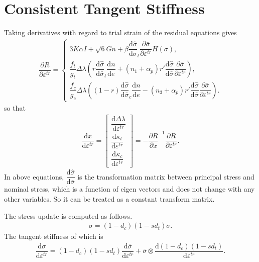 \documentclass[10pt,fleqn,3p]{elsarticle}
\newcommand*{\md}[1]{\mathrm{d}#1}
\newcommand*{\ddfrac}[2]{\dfrac{\md#1}{\md#2}}
\newcommand*{\pfrac}[2]{\dfrac{\partial#1}{\partial#2}}
\begin{document}
\section{Consistent Tangent Stiffness}
Taking derivatives with regard to trial strain of the residual equations gives
\begin{gather}
\pfrac{R}{\varepsilon^{tr}}=\left\{
\begin{array}{l}
3K\alpha{}I+\sqrt{6}Gn+\beta\ddfrac{\hat\sigma}{\bar\sigma}_t\pfrac{\bar\sigma}{\varepsilon^{tr}}H(\sigma),\\
\dfrac{f_t}{g_t}\Delta\lambda\left(r\ddfrac{\hat\sigma}{\bar\sigma}_t\ddfrac{n}{e}+\left(n_1+\alpha_p\right)r'\ddfrac{\hat\sigma}{\bar\sigma}\pfrac{\bar\sigma}{\varepsilon^{tr}}\right),\\
\dfrac{f_c}{g_c}\Delta\lambda\left(\left(1-r\right)\ddfrac{\hat\sigma}{\bar\sigma}_c\ddfrac{n}{e}-\left(n_3+\alpha_p\right)r'\ddfrac{\hat\sigma}{\bar\sigma}\pfrac{\bar\sigma}{\varepsilon^{tr}}\right).
\end{array}
\right.
\end{gather}
so that
\begin{gather}
\ddfrac{x}{\varepsilon^{tr}}=\begin{bmatrix}
\ddfrac{\Delta\lambda}{\varepsilon^{tr}}\\[3mm]
\ddfrac{\kappa_t}{\varepsilon^{tr}}\\[3mm]
\ddfrac{\kappa_c}{\varepsilon^{tr}}
\end{bmatrix}=-\pfrac{R}{x}^{-1}\pfrac{R}{\varepsilon^{tr}}.
\end{gather}
In above equations, $\ddfrac{\hat\sigma}{\bar\sigma}$ is the transformation matrix between principal stress and nominal stress, which is a function of eigen vectors and does not change with any other variables. So it can be treated as a constant transform matrix.

The stress update is computed as follows.
\begin{gather}
\sigma=(1-d_c)(1-sd_t)\bar{\sigma}.
\end{gather}
The tangent stiffness of which is
\begin{gather}
\ddfrac{\sigma}{\varepsilon^{tr}}=(1-d_c)(1-sd_t)\ddfrac{\bar{\sigma}}{\varepsilon^{tr}}+\bar{\sigma}\otimes\ddfrac{(1-d_c)(1-sd_t)}{\varepsilon^{tr}}.
\end{gather}
\end{document}
